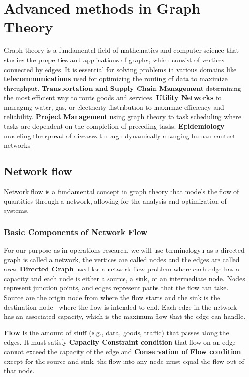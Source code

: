 \documentclass[12pt]{article}
\begin{document}
\section{Advanced methods in Graph Theory}
%
    Graph theory is a fundamental field of mathematics and computer science that
    studies the properties and applications of graphs, which consist of vertices
    connected by edges. It is essential for solving problems in various domains like
    \textbf{telecommunications} used for optimizing the routing of data to maximize
    throughput. \textbf{Transportation and Supply Chain Management} determining the
    most efficient way to route goods and services. \textbf{Utility Networks} to
    managing water, gas, or electricity distribution to maximize efficiency and
    reliability. \textbf{Project Management} using graph theory to task scheduling
    where tasks are dependent on the completion of preceding tasks.
    \textbf{Epidemiology} modeling the spread of diseases through dynamically
    changing human contact networks.
%
    \subsection{Network flow}
    Network flow is a fundamental concept in graph theory that models the
    flow of quantities through a network, allowing for the analysis and
    optimization of systems.

    \subsubsection{Basic Components of Network Flow}

    For our purpose as in operations research, we will use terminologyu as a directed
    graph is called a network, the vertices are called nodes and the edges are called arcs.
    \textbf{Directed Graph} used for a network flow problem where each edge has
    a capacity and each node is either a source, a sink, or an intermediate node.
    Nodes represent junction points, and edges represent paths that the flow can take.
    Source are the origin node from where the flow starts and the sink is the
    destination node~\cite{diestel2017graph} where the flow is intended to end. Each edge in the network has
    an associated capacity, which is the maximum flow that the edge can handle.
    
    \textbf{Flow} is the amount of stuff (e.g., data, goods, traffic) that passes along the edges.
    It must satisfy \textbf{Capacity Constraint condition} that flow on an edge cannot
    exceed the capacity of the edge and 
    \textbf{Conservation of Flow condition} except for the source and sink, the flow
    into any node must equal the flow out of that node.
\end{document}

